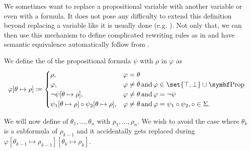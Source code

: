 \begin{definition}\label{def:propositional_substitution}
  We sometimes want to replace a propositional variable with another variable or even with a formula. It does not pose any difficulty to extend this definition beyond replacing a variable like it is usually done (e.g. \cite[def. 7.8]{OpenLogic20201202}). Not only that, we can then use this mechanism to define complicated rewriting rules as in  and have semantic equivalence automatically follow from .

  \begin{defenum}
     We define the  of the propositional formula \( \psi \) with \( \rho \) in \( \varphi \) as
    \begin{equation}\label{eq:def:propositional_substitution/single}
      \varphi[\theta \mapsto \rho] \coloneqq \begin{cases}
        \rho,                                                          &\varphi = \theta \\
        \varphi,                                                       &\varphi \neq \theta \T{and} \varphi \in \set{ \top, \bot } \cup \bfop{Prop} \\
        \neg \psi[\theta \mapsto \rho],                                &\varphi \neq \theta \T{and} \varphi = \neg \psi \\
        \psi_1[\theta \mapsto \rho] \circ \psi_2[\theta \mapsto \rho], &\varphi \neq \theta \T{and} \varphi = \psi_1 \circ \psi_2, \circ \in \Sigma.
      \end{cases}
    \end{equation}

     We will now define  of \( \theta_1, \ldots, \theta_n \) with \( \rho_1, \ldots, \rho_n \). We wish to avoid the case where \( \theta_k \) is a subformula of \( \rho_{k-1} \) and it accidentally gets replaced during \( \varphi[\theta_{k-1} \mapsto \rho_{k-1}][\theta_k \mapsto \rho_k] \).


\end{defenum}
\end{definition}
